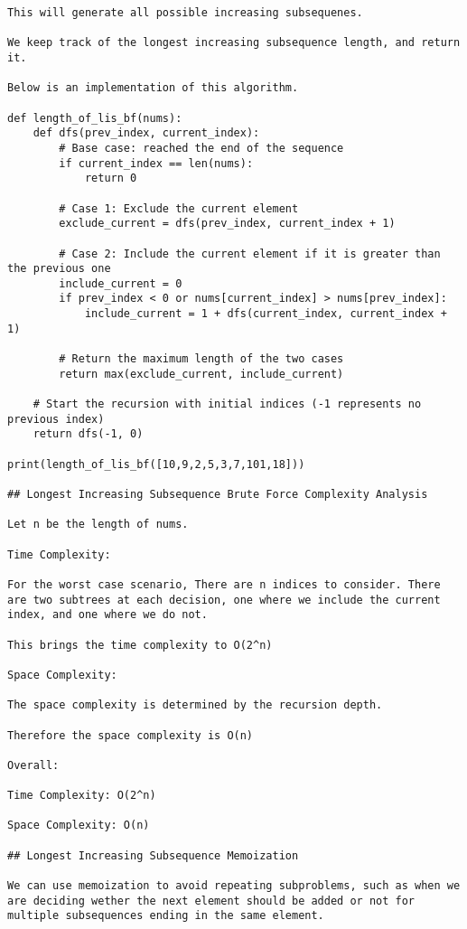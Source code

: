 \begin{verbatim}
This will generate all possible increasing subsequenes.

We keep track of the longest increasing subsequence length, and return it.

Below is an implementation of this algorithm.

def length_of_lis_bf(nums):
    def dfs(prev_index, current_index):
        # Base case: reached the end of the sequence
        if current_index == len(nums):
            return 0

        # Case 1: Exclude the current element
        exclude_current = dfs(prev_index, current_index + 1)

        # Case 2: Include the current element if it is greater than the previous one
        include_current = 0
        if prev_index < 0 or nums[current_index] > nums[prev_index]:
            include_current = 1 + dfs(current_index, current_index + 1)

        # Return the maximum length of the two cases
        return max(exclude_current, include_current)

    # Start the recursion with initial indices (-1 represents no previous index)
    return dfs(-1, 0)

print(length_of_lis_bf([10,9,2,5,3,7,101,18]))

## Longest Increasing Subsequence Brute Force Complexity Analysis

Let n be the length of nums.

Time Complexity:

For the worst case scenario, There are n indices to consider. There are two subtrees at each decision, one where we include the current index, and one where we do not.

This brings the time complexity to O(2^n)

Space Complexity:

The space complexity is determined by the recursion depth.

Therefore the space complexity is O(n)

Overall:

Time Complexity: O(2^n)

Space Complexity: O(n)

## Longest Increasing Subsequence Memoization

We can use memoization to avoid repeating subproblems, such as when we are deciding wether the next element should be added or not for multiple subsequences ending in the same element.


\end{verbatim}
